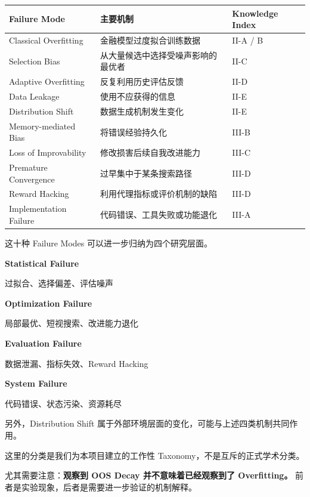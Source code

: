 \begin{readertable}
\begin{longtable}[]{@{}
  >{\raggedright\arraybackslash}p{}
  >{\raggedright\arraybackslash}p{}
  >{\raggedright\arraybackslash}p{}@{}}
\toprule
Failure Mode & 主要机制 & Knowledge Index \\
\midrule
\endhead
Classical Overfitting & 金融模型过度拟合训练数据 & II-A / B \\
Selection Bias & 从大量候选中选择受噪声影响的最优者 & II-C \\
Adaptive Overfitting & 反复利用历史评估反馈 & II-D \\
Data Leakage & 使用不应获得的信息 & II-E \\
Distribution Shift & 数据生成机制发生变化 & II-E \\
Memory-mediated Bias & 将错误经验持久化 & III-B \\
Loss of Improvability & 修改损害后续自我改进能力 & III-C \\
Premature Convergence & 过早集中于某条搜索路径 & III-D \\
Reward Hacking & 利用代理指标或评价机制的缺陷 & III-D \\
Implementation Failure & 代码错误、工具失败或功能退化 & III-A \\
\bottomrule
\end{longtable}
\end{readertable}

这十种 Failure Modes 可以进一步归纳为四个研究层面。

\textbf{Statistical Failure}

过拟合、选择偏差、评估噪声

\textbf{Optimization Failure}

局部最优、短视搜索、改进能力退化

\textbf{Evaluation Failure}

数据泄漏、指标失效、Reward Hacking

\textbf{System Failure}

代码错误、状态污染、资源耗尽

另外，Distribution Shift 属于外部环境层面的变化，可能与上述四类机制共同作用。

这里的分类是我们为本项目建立的工作性 Taxonomy，不是互斥的正式学术分类。

尤其需要注意：\textbf{观察到 OOS Decay 并不意味着已经观察到了 Overfitting。} 前者是实验现象，后者是需要进一步验证的机制解释。


